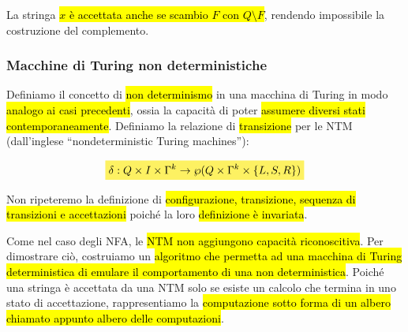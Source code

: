 \documentclass[a4paper,11pt,twoside]{article}
\theoremstyle{plain}
\theoremstyle{definition}
\theoremstyle{remark}
\newcommand{\mhl}[1]{\colorbox{hlcolor}{$\displaystyle #1$}}
\begin{document}
La stringa \hl{$x$ è accettata anche se scambio $F$ con $Q \setminus F$},
rendendo impossibile la costruzione del complemento.

\subsubsection{Macchine di Turing non deterministiche}\label{sec:ntm}

Definiamo il concetto di \hl{non determinismo} in una macchina di Turing in modo
\hl{analogo ai casi precedenti}, ossia la capacità di poter \hl{assumere diversi
stati contemporaneamente}. Definiamo la relazione di \hl{transizione} per le NTM
(dall'inglese ``nondeterministic Turing machines''):

\begin{equation}
  \mhl{
    \delta : Q \times I \times \Gamma^k \to
      \wp(Q \times \Gamma^k \times \{ L,S,R \})
  }
\end{equation}

Non ripeteremo la definizione di \hl{configurazione, transizione, sequenza di
transizioni e accettazioni} poiché la loro \hl{definizione è invariata}.

Come nel caso degli NFA, le \hl{NTM non aggiungono capacità riconoscitiva}. Per
dimostrare ciò, costruiamo un \hl{algoritmo che permetta ad una macchina di
Turing deterministica di emulare il comportamento di una non deterministica}.
Poiché una stringa è accettata da una NTM solo se esiste un calcolo che termina
in uno stato di accettazione, rappresentiamo la \hl{computazione sotto forma di
un albero chiamato appunto albero delle computazioni}.
\end{document}
